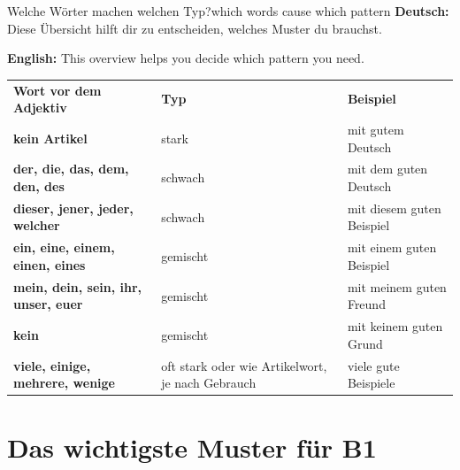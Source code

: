 \documentclass[a4paper,11pt]{article}
\newcommand{\GermanText}[1]{\textbf{Deutsch: }#1\par}
\newcommand{\EnglishText}[1]{{\small\color{SoftGray}\textbf{English: }#1\par}}
\begin{document}
\begin{grammarentry}{Welche Wörter machen welchen Typ?}{which words cause which pattern}
\GermanText{Diese Übersicht hilft dir zu entscheiden, welches Muster du brauchst.}
\EnglishText{This overview helps you decide which pattern you need.}

\begin{center}
\begin{tabular}{>{\bfseries}p{4cm}p{4cm}p{6cm}}
\rowcolor{HeaderBlueDark}
\color{white}\textbf{Wort vor dem Adjektiv} & \color{white}\textbf{Typ} & \color{white}\textbf{Beispiel} \\
kein Artikel & stark & mit gutem Deutsch \\
der, die, das, dem, den, des & schwach & mit dem guten Deutsch \\
dieser, jener, jeder, welcher & schwach & mit diesem guten Beispiel \\
ein, eine, einem, einen, eines & gemischt & mit einem guten Beispiel \\
mein, dein, sein, ihr, unser, euer & gemischt & mit meinem guten Freund \\
kein & gemischt & mit keinem guten Grund \\
viele, einige, mehrere, wenige & oft stark oder wie Artikelwort, je nach Gebrauch & viele gute Beispiele \\
\end{tabular}
\end{center}
\end{grammarentry}

\section{Das wichtigste Muster für B1}
\end{document}
